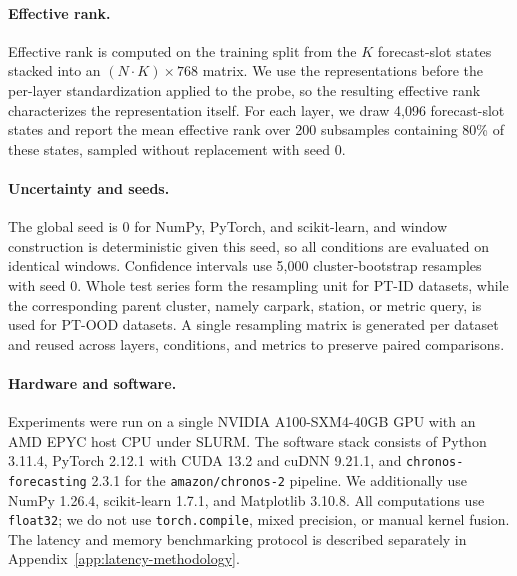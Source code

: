 \documentclass{article}
\begin{document}
\paragraph{Effective rank.}
Effective rank is computed on the training split from the \(K\) forecast-slot states stacked into an
\((N \cdot K) \times 768\) matrix. We use the representations before the per-layer standardization applied to the probe, so the resulting effective rank characterizes the representation itself. For each layer, we draw 4,096 forecast-slot states and report the mean effective rank over 200 subsamples containing 80\% of these states, sampled without replacement with seed 0.

\paragraph{Uncertainty and seeds.}
The global seed is 0 for NumPy, PyTorch, and scikit-learn, and window construction is deterministic given this seed, so all conditions are evaluated on identical windows. Confidence intervals use 5,000 cluster-bootstrap resamples with seed 0. Whole test series form the resampling unit for PT-ID datasets, while the corresponding parent cluster, namely carpark, station, or metric query, is used for PT-OOD datasets. A single resampling matrix is generated per dataset and reused across layers, conditions, and metrics to preserve paired comparisons.

\paragraph{Hardware and software.}
Experiments were run on a single NVIDIA A100-SXM4-40GB GPU with an AMD EPYC host CPU under SLURM. The software stack consists of Python 3.11.4, PyTorch 2.12.1 with CUDA 13.2 and cuDNN 9.21.1, and \texttt{chronos-forecasting} 2.3.1 for the \texttt{amazon/chronos-2} pipeline. We additionally use NumPy 1.26.4, scikit-learn 1.7.1, and Matplotlib 3.10.8. All computations use \texttt{float32}; we do not use \texttt{torch.compile}, mixed precision, or manual kernel fusion. The latency and memory benchmarking protocol is described separately in Appendix~\ref{app:latency-methodology}.
\end{document}
